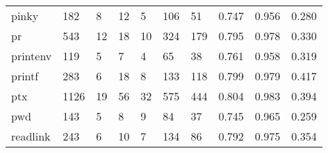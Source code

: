 \begin{longtable}{lp{2.0cm}p{2.0cm}p{2.0cm}p{2.0cm}p{2.0cm}p{2.0cm}p{2.0cm}p{2.0cm}p{2.0cm}}
pinky     &                    182 &                                  8 &                                12 &                                5 &                               106 &                              51 &                                   0.747 &                                  0.956 &                                0.280 \\
pr        &                    543 &                                 12 &                                18 &                               10 &                               324 &                             179 &                                   0.795 &                                  0.978 &                                0.330 \\
printenv  &                    119 &                                  5 &                                 7 &                                4 &                                65 &                              38 &                                   0.761 &                                  0.958 &                                0.319 \\
printf    &                    283 &                                  6 &                                18 &                                8 &                               133 &                             118 &                                   0.799 &                                  0.979 &                                0.417 \\
ptx       &                   1126 &                                 19 &                                56 &                               32 &                               575 &                             444 &                                   0.804 &                                  0.983 &                                0.394 \\
pwd       &                    143 &                                  5 &                                 8 &                                9 &                                84 &                              37 &                                   0.745 &                                  0.965 &                                0.259 \\
readlink  &                    243 &                                  6 &                                10 &                                7 &                               134 &                              86 &                                   0.792 &                                  0.975 &                                0.354 \\

\end{longtable}
